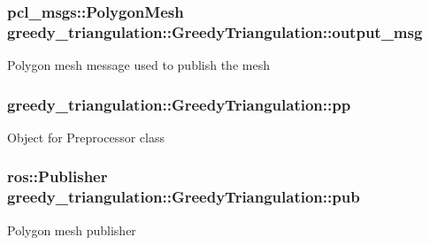 \subsubsection[{\texorpdfstring{output\+\_\+msg}{output_msg}}]{\setlength{\rightskip}{0pt plus 5cm}pcl\+\_\+msgs\+::\+Polygon\+Mesh greedy\+\_\+triangulation\+::\+Greedy\+Triangulation\+::output\+\_\+msg\hspace{0.3cm}{\ttfamily [private]}}\hypertarget{classgreedy__triangulation_1_1_greedy_triangulation_acd6529152058723f54dd5e9f1d0b040d}{}\label{classgreedy__triangulation_1_1_greedy_triangulation_acd6529152058723f54dd5e9f1d0b040d}
Polygon mesh message used to publish the mesh 
\subsubsection[{\texorpdfstring{pp}{pp}}]{ greedy\+\_\+triangulation\+::\+Greedy\+Triangulation\+::pp\hspace{0.3cm}{\ttfamily [private]}}\hypertarget{classgreedy__triangulation_1_1_greedy_triangulation_a9f5ea346f74bd3352a341319a6bb2e53}{}\label{classgreedy__triangulation_1_1_greedy_triangulation_a9f5ea346f74bd3352a341319a6bb2e53}
Object for Preprocessor class 
\subsubsection[{\texorpdfstring{pub}{pub}}]{\setlength{\rightskip}{0pt plus 5cm}ros\+::\+Publisher greedy\+\_\+triangulation\+::\+Greedy\+Triangulation\+::pub\hspace{0.3cm}{\ttfamily [private]}}\hypertarget{classgreedy__triangulation_1_1_greedy_triangulation_a6ca8884fc1b5b2fcd5fc4c9c7c290451}{}\label{classgreedy__triangulation_1_1_greedy_triangulation_a6ca8884fc1b5b2fcd5fc4c9c7c290451}
Polygon mesh publisher 
